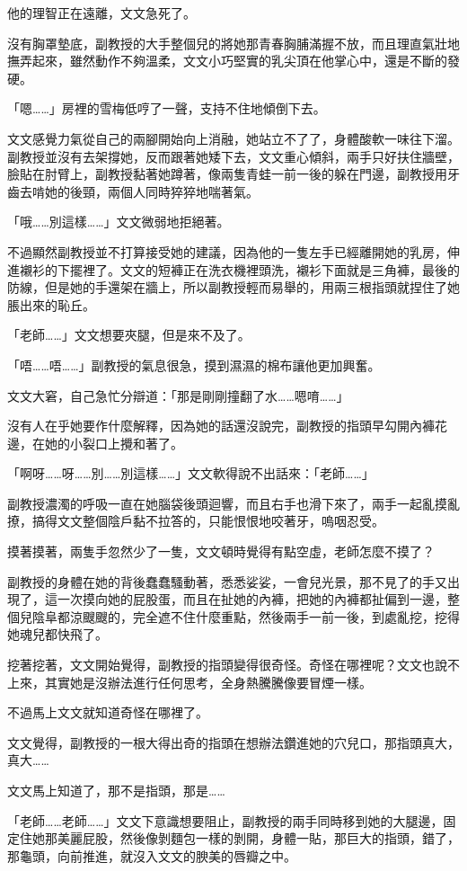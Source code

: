 他的理智正在遠離，文文急死了。

沒有胸罩墊底，副教授的大手整個兒的將她那青春胸脯滿握不放，而且理直氣壯地撫弄起來，雖然動作不夠溫柔，文文小巧堅實的乳尖頂在他掌心中，還是不斷的發硬。

「嗯……」房裡的雪梅低哼了一聲，支持不住地傾倒下去。

文文感覺力氣從自己的兩腳開始向上消融，她站立不了了，身體酸軟一味往下溜。副教授並沒有去架撐她，反而跟著她矮下去，文文重心傾斜，兩手只好扶住牆壁，臉貼在肘臂上，副教授黏著她蹲著，像兩隻青蛙一前一後的躲在門邊，副教授用牙齒去啃她的後頸，兩個人同時猝猝地喘著氣。

「哦……別這樣……」文文微弱地拒絕著。

不過顯然副教授並不打算接受她的建議，因為他的一隻左手已經離開她的乳房，伸進襯衫的下擺裡了。文文的短褲正在洗衣機裡頭洗，襯衫下面就是三角褲，最後的防線，但是她的手還架在牆上，所以副教授輕而易舉的，用兩三根指頭就捏住了她脹出來的恥丘。

「老師……」文文想要夾腿，但是來不及了。

「唔……唔……」副教授的氣息很急，摸到濕濕的棉布讓他更加興奮。

文文大窘，自己急忙分辯道：「那是剛剛撞翻了水……嗯唷……」

沒有人在乎她要作什麼解釋，因為她的話還沒說完，副教授的指頭早勾開內褲花邊，在她的小裂口上攪和著了。

「啊呀……呀……別……別這樣……」文文軟得說不出話來：「老師……」

副教授濃濁的呼吸一直在她腦袋後頭迴響，而且右手也滑下來了，兩手一起亂摸亂撩，搞得文文整個陰戶黏不拉答的，只能恨恨地咬著牙，嗚咽忍受。

摸著摸著，兩隻手忽然少了一隻，文文頓時覺得有點空虛，老師怎麼不摸了？

副教授的身體在她的背後蠢蠢騷動著，悉悉娑娑，一會兒光景，那不見了的手又出現了，這一次摸向她的屁股蛋，而且在扯她的內褲，把她的內褲都扯偏到一邊，整個兒陰阜都涼颼颼的，完全遮不住什麼重點，然後兩手一前一後，到處亂挖，挖得她魂兒都快飛了。

挖著挖著，文文開始覺得，副教授的指頭變得很奇怪。奇怪在哪裡呢？文文也說不上來，其實她是沒辦法進行任何思考，全身熱騰騰像要冒煙一樣。

不過馬上文文就知道奇怪在哪裡了。

文文覺得，副教授的一根大得出奇的指頭在想辦法鑽進她的穴兒口，那指頭真大，真大……

文文馬上知道了，那不是指頭，那是……

「老師……老師……」文文下意識想要阻止，副教授的兩手同時移到她的大腿邊，固定住她那美麗屁股，然後像剝麵包一樣的剝開，身體一貼，那巨大的指頭，錯了，那龜頭，向前推進，就沒入文文的腴美的唇瓣之中。

